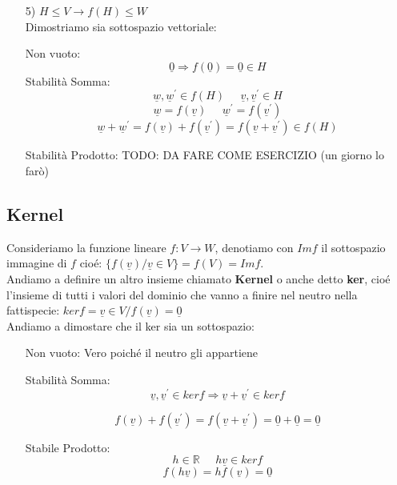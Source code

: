 \begin{itemize}
\item[5)] $H \le V \rightarrow f(H) \le W$\\
Dimostriamo sia sottospazio vettoriale:

\subitem Non vuoto:
$$ \underline{0} \Rightarrow f(\underline{0})= \underline{0} \in H $$
\subitem Stabilità Somma:
$$ \underline{w},\underline{w}^{\prime} \in f(H) \;\;\;\;\; \underline{v},\underline{v}^{\prime} \in H $$
$$ \underline{w} = f(\underline{v}) \;\;\;\;\; \underline{w}^{\prime} = f(\underline{v}^{\prime}) $$
$$ \underline{w}+\underline{w}^{\prime} = f(\underline{v})+f(\underline{v}^{\prime})= f(\underline{v}+\underline{v}^{\prime}) \in f(H) $$

\subitem Stabilità Prodotto:
TODO: DA FARE COME ESERCIZIO (un giorno lo farò)

\end{itemize}

\subsection{Kernel}

Consideriamo la funzione lineare $f: V \rightarrow W$, denotiamo con $Im f$ il sottospazio immagine di $f$ cioé: $\{f(\underline{v})/\underline{v} \in V\}=f(V) = Im f$.\\

Andiamo a definire un altro insieme chiamato \textbf{Kernel} o anche detto \textbf{ker}, cioé l'insieme di tutti i valori del dominio che vanno a finire nel neutro nella fattispecie: $ ker f = {\underline{v} \in V / f(\underline{v}) = \underline{0}} $\\

Andiamo a dimostare che il ker sia un sottospazio:
\begin{itemize}
\item[Non vuoto:] Vero poiché il neutro gli appartiene

\item[Stabilità Somma:]
$$ \underline{v},\underline{v}^{\prime} \in ker f \Rightarrow \underline{v}+\underline{v}^{\prime} \in ker f $$

$$ f(\underline{v})+f(\underline{v}^{\prime}) = f(\underline{v}+ \underline{v}^{\prime}) = \underline{0}+\underline{0} = \underline{0} $$

\item[Stabile Prodotto:]
$$ h \in \mathbb{R} \;\;\;\;\; h\underline{v} \in ker f$$
$$ f(h\underline{v}) = hf(\underline{v}) = \underline{0} $$

\end{itemize}


